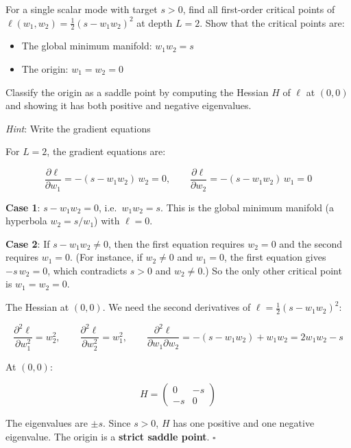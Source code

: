 \documentclass[11pt]{article}
\providecommand{\tightlist}{%
  \setlength{\itemsep}{0pt}\setlength{\parskip}{0pt}}
\begin{document}
\begin{exercise}
\label{ex:td-1b}
For a single scalar mode with target \(s > 0\), find all
first-order critical points of
\(\ell(w_1, w_2) = \frac{1}{2}(s - w_1 w_2)^2\) at depth \(L = 2\). Show
that the critical points are:

\begin{itemize}
\tightlist
\item
  The global minimum manifold: \(w_1 w_2 = s\)
\item
  The origin: \(w_1 = w_2 = 0\)
\end{itemize}

Classify the origin as a saddle point by computing the Hessian \(H\) of
\(\ell\) at \((0,0)\) and showing it has both positive and negative
eigenvalues.

\emph{Hint}: Write the gradient equations
\end{exercise}

\begin{solution}[ex:td-1b]
For \(L = 2\), the gradient equations are:

\[\frac{\partial \ell}{\partial w_1} = -(s - w_1 w_2)\,w_2 = 0, \qquad \frac{\partial \ell}{\partial w_2} = -(s - w_1 w_2)\,w_1 = 0\]

\textbf{Case 1}: \(s - w_1 w_2 = 0\), i.e.~\(w_1 w_2 = s\). This is the
global minimum manifold (a hyperbola \(w_2 = s/w_1\)) with \(\ell = 0\).

\textbf{Case 2}: If \(s - w_1 w_2 \neq 0\), then the first equation
requires \(w_2 = 0\) and the second requires \(w_1 = 0\). (For instance,
if \(w_2 \neq 0\) and \(w_1 = 0\), the first equation gives
\(-s\,w_2 = 0\), which contradicts \(s > 0\) and \(w_2 \neq 0\).) So the
only other critical point is \(w_1 = w_2 = 0\).

The Hessian at \((0,0)\). We need the second derivatives of
\(\ell = \frac{1}{2}(s - w_1 w_2)^2\):

\[\frac{\partial^2 \ell}{\partial w_1^2} = w_2^2, \qquad \frac{\partial^2 \ell}{\partial w_2^2} = w_1^2, \qquad \frac{\partial^2 \ell}{\partial w_1 \partial w_2} = -(s - w_1 w_2) + w_1 w_2 = 2w_1 w_2 - s\]

At \((0,0)\):

\[H = \begin{pmatrix} 0 & -s \\ -s & 0 \end{pmatrix}\]

The eigenvalues are \(\pm s\). Since \(s > 0\), \(H\) has one positive
and one negative eigenvalue. The origin is a \textbf{strict saddle
point}. \(\square\)
\end{solution}
\end{document}
